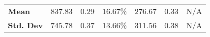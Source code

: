 \documentclass[sigconf,review, anonymous]{acmart}
\begin{document}
\begin{table}[htbp]
{\begin{tabularx}{\columnwidth}{X|crr|crr}
%    
%
\textbf{Mean}   & 837.83 & 0.29 & 16.67\% & 276.67 & 0.33 & N/A\\
\textbf{Std. Dev} & 745.78 & 0.37 & 13.66\%   & 311.56 & 0.38 & N/A \\\bottomrule
\end{tabularx}}
\end{table}


\end{document}
